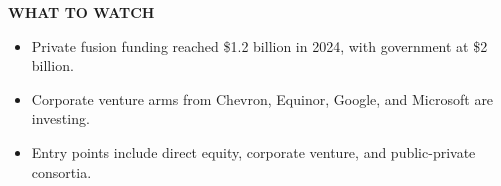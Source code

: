 \documentclass[10pt,a4paper]{article}
\begin{document}
\vspace{4pt}\noindent\begin{minipage}{\linewidth}
{\textcolor{BOGreen}{\scriptsize\bfseries WHAT TO WATCH}}\par\vspace{2pt}
{\footnotesize\begin{itemize}
\item Private fusion funding reached \$1.2 billion in 2024, with government at \$2 billion.
\item Corporate venture arms from Chevron, Equinor, Google, and Microsoft are investing.
\item Entry points include direct equity, corporate venture, and public-private consortia.
\end{itemize}}
\end{minipage}
\label{chap:7:end}
\end{document}
